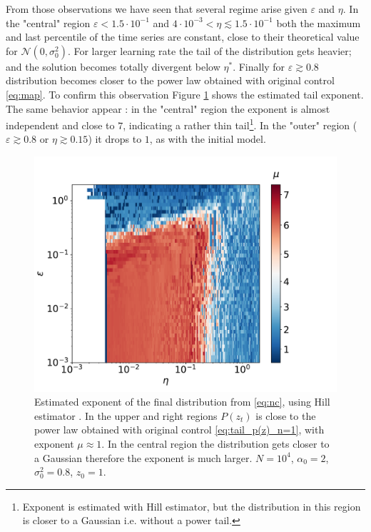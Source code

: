 \documentclass[FinalReport.tex]{subfiles}
\begin{document}
From those observations we have seen that several regime arise given $\varepsilon$ and $\eta$. In the "central" region $\varepsilon<1.5\cdot10^{-1}$ and $4\cdot10^{-3}<\eta\lesssim1.5\cdot10^{-1}$ both the maximum and last percentile of the time series are constant, close to their theoretical value for $\mathcal{N}(0,\sigma_0^2)$. For larger learning rate the tail of the distribution gets heavier; and the solution becomes totally divergent below $\eta^*$. Finally for $\varepsilon\gtrsim0.8$ distribution becomes closer to the power law obtained with original control \eqref{eq:map}. To confirm this observation Figure \ref{fig:mu_nc} shows the estimated tail exponent. The same behavior appear : in the "central" region the exponent is almost independent and close to $7$, indicating a rather thin tail\footnote{Exponent is estimated with Hill estimator, but the distribution in this region is closer to a Gaussian i.e. without a power tail.}. In the "outer" region ($\varepsilon\gtrsim0.8$ or $\eta\gtrsim 0.15$) it drops to $1$, as with the initial model.  


\begin{figure}[h!]
\centering
	\centering
	\includegraphics[width=1\textwidth]{Graphs/mu_nc}
	\caption{Estimated exponent of the final distribution from \eqref{eq:nc}, using Hill estimator \cite{Hill75}. In the upper and right regions $P(z_t)$ is close to the power law obtained with original control \eqref{eq:tail_p(z)_n=1}, with exponent $\mu\approx1$. In the central region the distribution gets closer to a Gaussian therefore the exponent is much larger. $N=10^4$, $\alpha_0=2$, $\sigma_0^2=0.8$, $z_0=1$.}%
	\label{fig:mu_nc}	
\end{figure}
\end{document}
